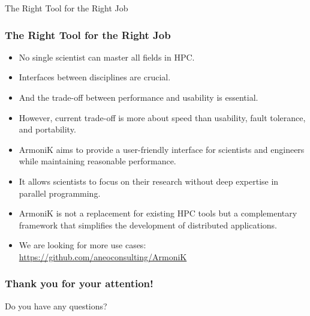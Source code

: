 \documentclass[10pt,aspectratio=1609]{beamer}
\begin{document}
\begin{section}{The Right Tool for the Right Job}
 \begin{frame}
   \frametitle{The Right Tool for the Right Job}
   \begin{itemize}
     \item No single scientist can master all fields in HPC.
     \item Interfaces between disciplines are crucial.
     \item And the trade-off between performance and usability is essential.
     \item However, current trade-off is more about speed than usability, fault tolerance, and portability.
     \item ArmoniK aims to provide a user-friendly interface for scientists and engineers while maintaining reasonable performance.
     \item It allows scientists to focus on their research without deep expertise in parallel programming.
     \item ArmoniK is not a replacement for existing HPC tools but a complementary framework that simplifies the development of distributed applications.
     \item We are looking for more use cases: \url{https://github.com/aneoconsulting/ArmoniK}
   \end{itemize}
 \end{frame}

 \begin{frame}
   \frametitle{Thank you for your attention!}
   Do you have any questions?
 \end{frame}
\end{section}
\end{document}
